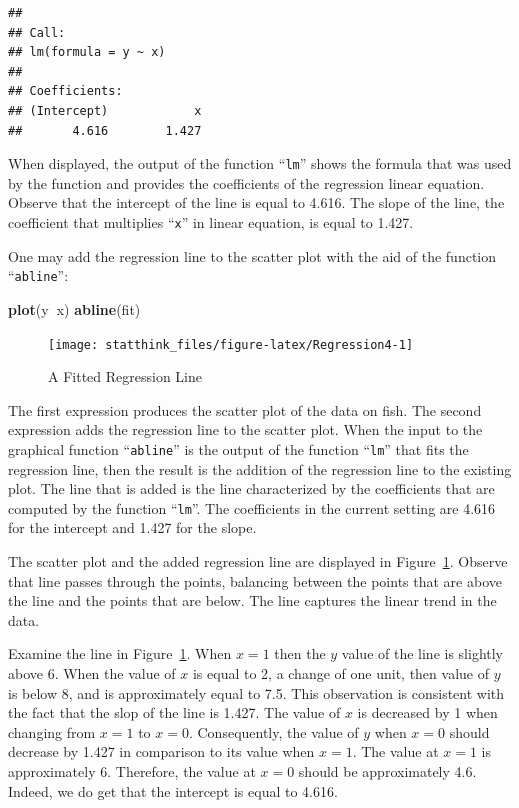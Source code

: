 \documentclass[
]{krantz}
\makeatletter
\newenvironment{Shaded}{\begin{snugshade}}{\end{snugshade}}
\newcommand{\KeywordTok}[1]{\textcolor[rgb]{0.13,0.29,0.53}{\textbf{#1}}}
\newcommand{\NormalTok}[1]{#1}
\newcommand{\OperatorTok}[1]{\textcolor[rgb]{0.81,0.36,0.00}{\textbf{#1}}}
\newenvironment{kframe}{%
\medskip{}
\setlength{\fboxsep}{.8em}
 \def\at@end@of@kframe{}%
 \ifinner\ifhmode%
  \def\at@end@of@kframe{\end{minipage}}%
  \begin{minipage}{\columnwidth}%
 \fi\fi%
 \def\FrameCommand##1{\hskip\@totalleftmargin \hskip-\fboxsep
 \colorbox{shadecolor}{##1}\hskip-\fboxsep
     \hskip-\linewidth \hskip-\@totalleftmargin \hskip\columnwidth}%
 \MakeFramed {\advance\hsize-\width
   \@totalleftmargin\z@ \linewidth\hsize
   \@setminipage}}%
 {\par\unskip\endMakeFramed%
 \at@end@of@kframe}
\renewenvironment{Shaded}{\begin{kframe}}{\end{kframe}}
\theoremstyle{definition}
\theoremstyle{definition}
\theoremstyle{definition}
\theoremstyle{remark}
\makeatother
\begin{document}
\begin{verbatim}
## 
## Call:
## lm(formula = y ~ x)
## 
## Coefficients:
## (Intercept)            x  
##       4.616        1.427
\end{verbatim}

When displayed, the output of the function ``\texttt{lm}'' shows the formula that
was used by the function and provides the coefficients of the regression
linear equation. Observe that the intercept of the line is equal to
4.616. The slope of the line, the coefficient that multiplies ``\texttt{x}'' in
linear equation, is equal to 1.427.

One may add the regression line to the scatter plot with the aid of the
function ``\texttt{abline}'':

\begin{Shaded}
\begin{Highlighting}[]
\KeywordTok{plot}\NormalTok{(y}\OperatorTok{~}\NormalTok{x)}
\KeywordTok{abline}\NormalTok{(fit)}
\end{Highlighting}
\end{Shaded}

\begin{figure}

{\centering \texttt{[image: statthink\_files/figure-latex/Regression4-1]} 

}

\caption{A Fitted Regression Line}\label{fig:Regression4}
\end{figure}

The first expression produces the scatter plot of the data on fish. The
second expression adds the regression line to the scatter plot. When the
input to the graphical function ``\texttt{abline}'' is the output of the function
``\texttt{lm}'' that fits the regression line, then the result is the addition of
the regression line to the existing plot. The line that is added is the
line characterized by the coefficients that are computed by the function
``\texttt{lm}''. The coefficients in the current setting are 4.616 for the
intercept and 1.427 for the slope.

The scatter plot and the added regression line are displayed in
Figure~\ref{fig:Regression4}. Observe that line passes through the
points, balancing between the points that are above the line and the
points that are below. The line captures the linear trend in the data.

Examine the line in Figure~\ref{fig:Regression4}. When \(x=1\) then the
\(y\) value of the line is slightly above 6. When the value of \(x\) is
equal to 2, a change of one unit, then value of \(y\) is below 8, and is
approximately equal to 7.5. This observation is consistent with the fact
that the slop of the line is 1.427. The value of \(x\) is decreased by 1
when changing from \(x=1\) to \(x=0\). Consequently, the value of \(y\) when
\(x=0\) should decrease by 1.427 in comparison to its value when \(x=1\).
The value at \(x=1\) is approximately 6. Therefore, the value at \(x=0\)
should be approximately 4.6. Indeed, we do get that the intercept is
equal to 4.616.
\end{document}
